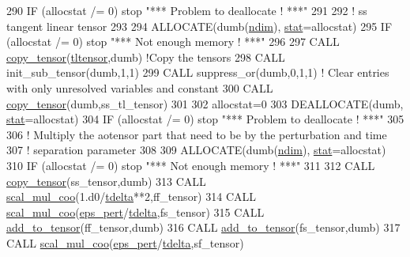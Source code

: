 \begin{DoxyCode}
290     \textcolor{keywordflow}{IF} (allocstat /= 0)  stop \textcolor{stringliteral}{"*** Problem to deallocate ! ***"}
291 
292     \textcolor{comment}{! ss tangent linear tensor}
293 
294     \textcolor{keyword}{ALLOCATE}(dumb(\hyperlink{namespaceparams_a2323fe1773f086e20c14f266351c482b}{ndim}), \hyperlink{namespacestat}{stat}=allocstat)
295     \textcolor{keywordflow}{IF} (allocstat /= 0) stop \textcolor{stringliteral}{"*** Not enough memory ! ***"}
296 
297     \textcolor{keyword}{CALL }\hyperlink{namespacetensor_a4a88ee8077278486c5128ad97617969e}{copy\_tensor}(\hyperlink{namespacetl__ad__tensor_a6180cfcc4d4ad119ef93266ea955903c}{tltensor},dumb) \textcolor{comment}{!Copy the tensors}
298     \textcolor{keyword}{CALL }init\_sub\_tensor(dumb,1,1)
299     \textcolor{keyword}{CALL }suppress\_or(dumb,0,1,1) \textcolor{comment}{! Clear entries with only unresolved variables and constant}
300     \textcolor{keyword}{CALL }\hyperlink{namespacetensor_a4a88ee8077278486c5128ad97617969e}{copy\_tensor}(dumb,ss\_tl\_tensor)
301 
302     allocstat=0
303     \textcolor{keyword}{DEALLOCATE}(dumb, \hyperlink{namespacestat}{stat}=allocstat)
304     \textcolor{keywordflow}{IF} (allocstat /= 0)  stop \textcolor{stringliteral}{"*** Problem to deallocate ! ***"}
305 
306     \textcolor{comment}{! Multiply the aotensor part that need to be by the perturbation and time}
307     \textcolor{comment}{! separation parameter}
308     
309     \textcolor{keyword}{ALLOCATE}(dumb(\hyperlink{namespaceparams_a2323fe1773f086e20c14f266351c482b}{ndim}), \hyperlink{namespacestat}{stat}=allocstat)
310     \textcolor{keywordflow}{IF} (allocstat /= 0) stop \textcolor{stringliteral}{"*** Not enough memory ! ***"}
311 
312     \textcolor{keyword}{CALL }\hyperlink{namespacetensor_a4a88ee8077278486c5128ad97617969e}{copy\_tensor}(ss\_tensor,dumb)
313     \textcolor{keyword}{CALL }\hyperlink{namespacetensor_af105ec6083969c52f5e7422d75a5cda5}{scal\_mul\_coo}(1.d0/\hyperlink{namespacestoch__params_a3995bce17d12b533df6b86ab0072b7c3}{tdelta}**2,ff\_tensor)
314     \textcolor{keyword}{CALL }\hyperlink{namespacetensor_af105ec6083969c52f5e7422d75a5cda5}{scal\_mul\_coo}(\hyperlink{namespacestoch__params_aa0504e89179fe42b3f3206811f1592dc}{eps\_pert}/\hyperlink{namespacestoch__params_a3995bce17d12b533df6b86ab0072b7c3}{tdelta},fs\_tensor)
315     \textcolor{keyword}{CALL }\hyperlink{namespacetensor_aad7cd55f3a4cec4676cc7ca34b05f1a8}{add\_to\_tensor}(ff\_tensor,dumb)
316     \textcolor{keyword}{CALL }\hyperlink{namespacetensor_aad7cd55f3a4cec4676cc7ca34b05f1a8}{add\_to\_tensor}(fs\_tensor,dumb)
317     \textcolor{keyword}{CALL }\hyperlink{namespacetensor_af105ec6083969c52f5e7422d75a5cda5}{scal\_mul\_coo}(\hyperlink{namespacestoch__params_aa0504e89179fe42b3f3206811f1592dc}{eps\_pert}/\hyperlink{namespacestoch__params_a3995bce17d12b533df6b86ab0072b7c3}{tdelta},sf\_tensor)

\end{DoxyCode}
